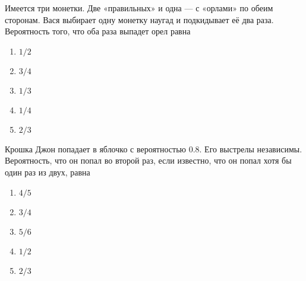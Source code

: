 \documentclass[t]{beamer}
\begin{document}
 \begin{frame} \label{3} 
\begin{block}{3} 

Имеется три монетки. Две «правильных» и одна — с «орлами» по обеим сторонам. Вася выбирает одну монетку наугад и подкидывает её два раза. Вероятность того, что оба раза выпадет орел равна
     


 \end{block} 
\begin{enumerate} 
\item[] \hyperlink{3-Yes}{\beamergotobutton{} $1/2$}
\item[] \hyperlink{3-No}{\beamergotobutton{} $3/4$
}
\item[] \hyperlink{3-No}{\beamergotobutton{} $1/3$}
\item[] \hyperlink{3-No}{\beamergotobutton{} $1/4$}
\item[] \hyperlink{3-No}{\beamergotobutton{} $2/3$}
\end{enumerate} 
\end{frame} 


 \begin{frame} \label{4} 
\begin{block}{4} 

Крошка Джон попадает в яблочко с вероятностью $0.8$. Его выстрелы независимы. Вероятность, что он попал во второй раз, если известно, что он попал хотя бы один раз из двух, равна


 \end{block} 
\begin{enumerate} 
\item[] \hyperlink{4-No}{\beamergotobutton{} $4/5$}
\item[] \hyperlink{4-No}{\beamergotobutton{} $3/4$}
\item[] \hyperlink{4-Yes}{\beamergotobutton{} $5/6$}
\item[] \hyperlink{4-No}{\beamergotobutton{} $1/2$}
\item[] \hyperlink{4-No}{\beamergotobutton{} $2/3$}
\end{enumerate} 
\end{frame} 
\end{document}
